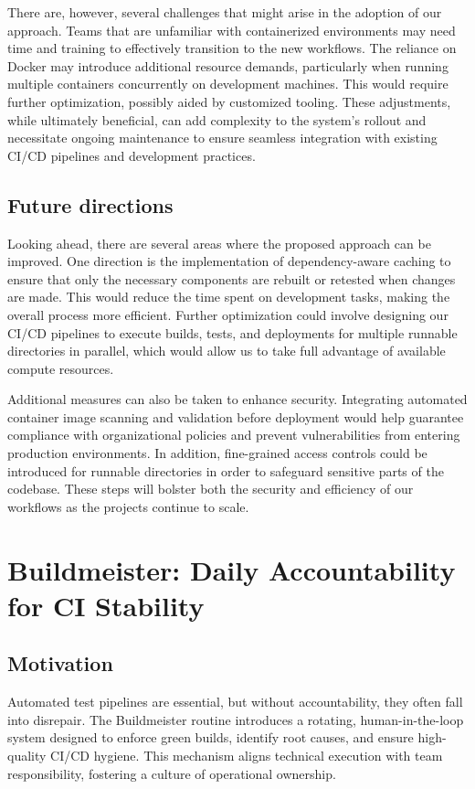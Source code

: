 \documentclass{article}
\begin{document}
There are, however, several challenges that might arise in the adoption of our
approach. Teams that are unfamiliar with containerized environments may need time
and training to effectively transition to the new workflows. The reliance on
Docker may introduce additional resource demands, particularly when running multiple
containers concurrently on development machines. This would require further
optimization, possibly aided by customized tooling. These adjustments, while ultimately
beneficial, can add complexity to the system's rollout and necessitate ongoing
maintenance to ensure seamless integration with existing CI/CD pipelines and
development practices.

\subsection{Future directions}

Looking ahead, there are several areas where the proposed approach can be
improved. One direction is the implementation of dependency-aware caching to ensure
that only the necessary components are rebuilt or retested when changes are made.
This would reduce the time spent on development tasks, making the overall process
more efficient. Further optimization could involve designing our CI/CD pipelines
to execute builds, tests, and deployments for multiple runnable directories in
parallel, which would allow us to take full advantage of available compute resources.

Additional measures can also be taken to enhance security. Integrating automated
container image scanning and validation before deployment would help guarantee
compliance with organizational policies and prevent vulnerabilities from
entering production environments. In addition, fine-grained access controls
could be introduced for runnable directories in order to safeguard sensitive
parts of the codebase. These steps will bolster both the security and efficiency
of our workflows as the projects continue to scale.

\section{Buildmeister: Daily Accountability for CI Stability}

\subsection{Motivation}

Automated test pipelines are essential, but without accountability, they often fall
into disrepair. The Buildmeister routine introduces a rotating, human-in-the-loop
system designed to enforce green builds, identify root causes, and ensure high-quality
CI/CD hygiene. This mechanism aligns technical execution with team
responsibility, fostering a culture of operational ownership.
\end{document}
